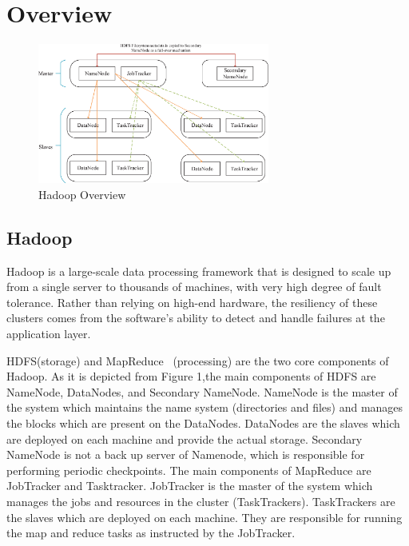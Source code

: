 \section{Overview}
\label{sec:overview}

\begin{figure}[t]
  \centering
  \includegraphics[width=3in]{figs/HadoopOverview.eps}
  \caption{Hadoop Overview}
  \label{fig:overview}
\end{figure}

\subsection{Hadoop}

Hadoop is a large-scale data processing framework that is designed to scale up from a single server to thousands of machines, with very high degree of fault tolerance. Rather than relying on high-end hardware, the resiliency of these clusters comes from the software's ability to detect and handle failures at the application layer.

HDFS(storage) and MapReduce~\cite{dean2008mapreduce} (processing) are the two core components of Hadoop. As it is depicted from Figure 1,the main components of HDFS are NameNode, DataNodes, and Secondary NameNode. NameNode is the master of the system which maintains the name system (directories and files) and manages the blocks which are present on the DataNodes. DataNodes are the slaves which are deployed on each machine and provide the actual storage. Secondary NameNode is not a back up server of Namenode, which is responsible for performing periodic checkpoints. The main components of MapReduce are JobTracker and Tasktracker. JobTracker is the master of the system which manages the jobs and resources in the cluster (TaskTrackers). TaskTrackers are the slaves which are deployed on each machine. They are responsible for running the map and reduce tasks as instructed by the JobTracker.

